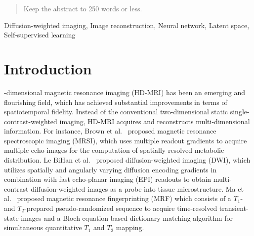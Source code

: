 \documentclass[journal,twoside,web]{ieeecolor}
\begin{document}
	\begin{abstract}
		Keep the abstract to 250 words or less.
	\end{abstract}

	\begin{IEEEkeywords}
	Diffusion-weighted imaging, Image reconstruction, Neural network, Latent space, Self-supervised learning
	\end{IEEEkeywords}

	\section{Introduction}
	\label{SEC:INTRO}
	-dimensional magnetic resonance imaging (HD-MRI)
	has been an emerging and flourishing field,
	which has achieved substantial improvements in terms of spatiotemporal fidelity.
	Instead of the conventional two-dimensional static single-contrast-weighted imaging,
	HD-MRI acquires and reconstructs multi-dimensional information.
	For instance, Brown et al.~\cite{brown_1982_mrsi}
	proposed magnetic resonance spectroscopic imaging (MRSI),
	which uses multiple readout gradients to acquire multiple echo images
	for the computation of spatially resolved metabolic distribution.
	Le BiHan et al.~\cite{lebihan_1986_diff} proposed
	diffusion-weighted imaging (DWI),
	which utilizes spatially and angularly varying
	diffusion encoding gradients in combination with
	fast echo-planar imaging (EPI) readouts \cite{mansfield_1977_epi}
	to obtain multi-contrast diffusion-weighted images
	as a probe into tissue microstructure.
	Ma et al.~\cite{ma_2013_mrf} proposed
	magnetic resonance fingerprinting (MRF)
	which consists of a $T_1$- and $T_2$-prepared pseudo-randomized sequence
	to acquire time-resolved transient-state images
	and a Bloch-equation-based dictionary matching algorithm \cite{doneva_2010_moba}
	for simultaneous quantitative $T_1$ and $T_2$ mapping.
\end{document}

